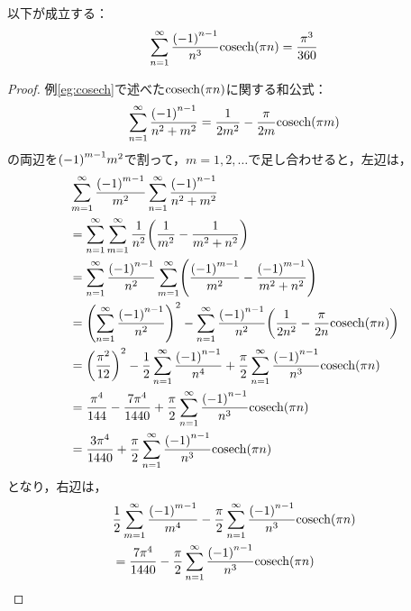 \documentclass[a4paper,draft]{ltjsarticle}
\begin{document}
\begin{cor}
    以下が成立する：
    \begin{equation}
        \sum_{n=1}^\infty \dfrac{\pare{-1}^{n-1}}{n^3}\fun{\cosech}{\pi n}=\dfrac{\pi^3}{360}
    \end{equation}
    
    \begin{proof}
        例\ref{eg:cosech}で述べた$\fun{\cosech}{\pi n}$に関する和公式：
        \begin{equation}
            \sum_{n=1}^\infty \dfrac{\pare{-1}^{n-1}}{n^2+m^2}=\dfrac{1}{2m^2}-\dfrac{\pi}{2m}\fun{\cosech}{\pi m}
        \end{equation}
        の両辺を$\pare{-1}^{m-1}m^2$で割って，$m=1,2,\dots$で足し合わせると，左辺は，
        \begin{align}
            &\sum_{m=1}^\infty \dfrac{\pare{-1}^{m-1}}{m^2}\sum_{n=1}^\infty \dfrac{\pare{-1}^{n-1}}{n^2+m^2}
            \\
            &=\sum_{n=1}^\infty\sum_{m=1}^\infty \dfrac{1}{n^2}\pare{\dfrac{1}{m^2}-\dfrac{1}{m^2+n^2}}
            \\
            &=\sum_{n=1}^\infty \dfrac{\pare{-1}^{n-1}}{n^2}\sum_{m=1}^\infty \pare{\dfrac{\pare{-1}^{m-1}}{m^2}-\dfrac{\pare{-1}^{m-1}}{m^2+n^2}}
            \\
            &=\pare{\sum_{n=1}^\infty \dfrac{\pare{-1}^{n-1}}{n^2}}^2-\sum_{n=1}^\infty \dfrac{\pare{-1}^{n-1}}{n^2}\pare{\dfrac{1}{2n^2}-\dfrac{\pi}{2n}\fun{\cosech}{\pi n}}
            \\
            &=\pare{\dfrac{\pi^2}{12}}^2-\dfrac{1}{2}\sum_{n=1}^\infty \dfrac{\pare{-1}^{n-1}}{n^4}+\dfrac{\pi}{2}\sum_{n=1}^\infty \dfrac{\pare{-1}^{n-1}}{n^3}\fun{\cosech}{\pi n}
            \\
            &=\dfrac{\pi^4}{144}-\dfrac{7\pi^4}{1440}
            +\dfrac{\pi}{2}\sum_{n=1}^\infty \dfrac{\pare{-1}^{n-1}}{n^3}\fun{\cosech}{\pi n}
            \\
            &=\dfrac{3\pi^4}{1440}+\dfrac{\pi}{2}\sum_{n=1}^\infty \dfrac{\pare{-1}^{n-1}}{n^3}\fun{\cosech}{\pi n}
        \end{align}
        となり，右辺は，
        \begin{align}
            &\dfrac{1}{2}\sum_{m=1}^\infty \dfrac{\pare{-1}^{m-1}}{m^4}-\dfrac{\pi}{2}\sum_{n=1}^\infty \dfrac{\pare{-1}^{n-1}}{n^3}\fun{\cosech}{\pi n}
            \\
            &=\dfrac{7\pi^4}{1440}
            -\dfrac{\pi}{2}\sum_{n=1}^\infty \dfrac{\pare{-1}^{n-1}}{n^3}\fun{\cosech}{\pi n}

\end{align}
\end{proof}
\end{cor}
\end{document}

